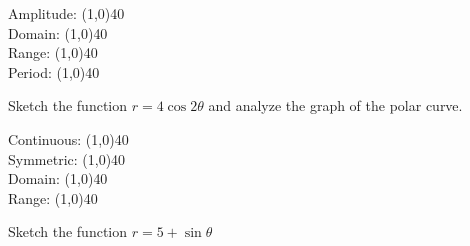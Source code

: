 \documentclass[../main.tex]{subfiles}
\begin{document}
\begin{questions}
        \begin{left} 
        \end{left}
    
    Amplitude: \line(1,0){40} \\
    \newline
    Domain: \line(1,0){40} \\
    \newline
    Range: \line(1,0){40} \\
    \newline
    Period: \line(1,0){40} \\
    
    
    \question[1] Sketch the function $r = 4\cos 2\theta$ and analyze the graph of the polar curve.
    
        \begin{left} 
        \end{left}
    
    Continuous: \line(1,0){40} \\
    \newline
    Symmetric: \line(1,0){40} \\
    \newline
    Domain: \line(1,0){40} \\
    \newline
    Range: \line(1,0){40} \\
    
    \newpage
    \question[1] Sketch the function $r = 5 + \sin\theta$
    
        \begin{left} 
        \end{left}
    

\end{questions}
\end{document}
